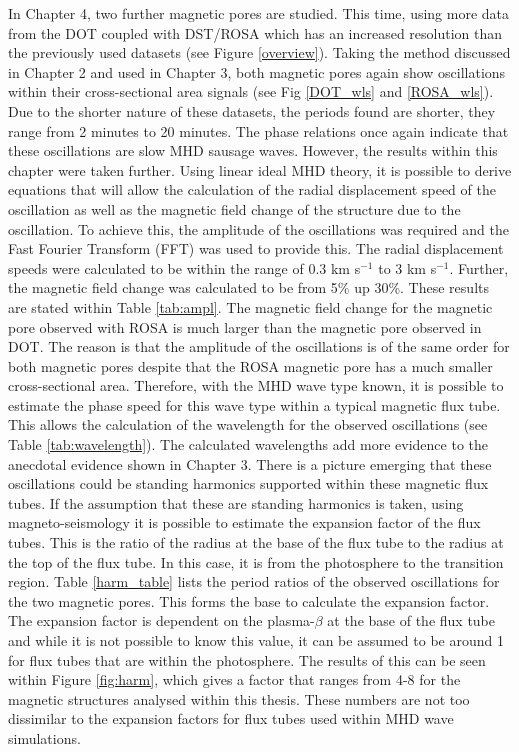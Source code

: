     In Chapter 4, two further magnetic pores are studied.
    This time, using more data from the DOT coupled with DST/ROSA which has an increased resolution than the previously used datasets (see Figure \ref{overview}).
    Taking the method discussed in Chapter 2 and used in Chapter 3, both magnetic pores again show oscillations within their cross-sectional area signals (see Fig \ref{DOT_wls} and \ref{ROSA_wls}).     
    Due to the shorter nature of these datasets, the periods found are shorter, they range from 2 minutes to 20 minutes.
    The phase relations once again indicate that these oscillations are slow MHD sausage waves.
    However, the results within this chapter were taken further.
    Using linear ideal MHD theory, it is possible to derive equations that will allow the calculation of the radial displacement speed of the oscillation as well as the magnetic field change of the structure due to the oscillation.
    To achieve this, the amplitude of the oscillations was required and the Fast Fourier Transform (FFT) was used to provide this.
    The radial displacement speeds were calculated to be within the range of 0.3 km s$^{-1}$ to 3 km s$^{-1}$. 
    Further, the magnetic field change was calculated to be from 5\% up 30\%. 
    These results are stated within Table \ref{tab:ampl}.
    The magnetic field change for the magnetic pore observed with ROSA is much larger than the magnetic pore observed in DOT.
    The reason is that the amplitude of the oscillations is of the same order for both magnetic pores despite that the ROSA magnetic pore has a much smaller cross-sectional area.
    Therefore, with the MHD wave type known, it is possible to estimate the phase speed for this wave type within a typical magnetic flux tube.
    This allows the calculation of the wavelength for the observed oscillations (see Table \ref{tab:wavelength}).
    The calculated wavelengths add more evidence to the anecdotal evidence shown in Chapter 3.
    There is a picture emerging that these oscillations could be standing harmonics supported within these magnetic flux tubes. 
    If the assumption that these are standing harmonics is taken, using magneto-seismology it is possible to estimate the expansion factor of the flux tubes.
    This is the ratio of the radius at the base of the flux tube to the radius at the top of the flux tube.
    In this case, it is from the photosphere to the transition region.
    Table \ref{harm_table} lists the period ratios of the observed oscillations for the two magnetic pores.
    This forms the base to calculate the expansion factor.
    The expansion factor is dependent on the plasma-$\beta$ at the base of the flux tube and while it is not possible to know this value, it can be assumed to be around 1 for flux tubes that are within the photosphere.
    The results of this can be seen within Figure \ref{fig:harm}, which gives a factor that ranges from 4-8 for the magnetic structures analysed within this thesis.
    These numbers are not too dissimilar to the expansion factors for flux tubes used within MHD wave simulations.

